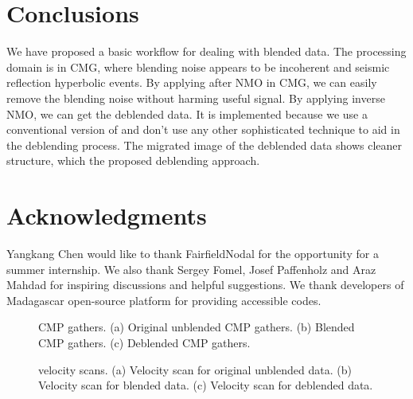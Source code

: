 \section{Conclusions}
We have proposed a basic workflow for dealing with blended data. The processing domain is in CMG, where blending noise appears to be incoherent and seismic reflection  hyperbolic events. By applying    after NMO in CMG, we can easily remove the blending noise without harming useful signal. By applying inverse NMO, we can get the deblended data.   It is  implemented because we  use a conventional version of  and don't use any other sophisticated technique to aid in the deblending process. The migrated image of the deblended data shows cleaner structure, which  the proposed deblending approach.

\section{Acknowledgments}
Yangkang Chen would like to thank FairfieldNodal for the opportunity for a summer internship. We also thank Sergey Fomel, Josef Paffenholz and Araz Mahdad for inspiring discussions and helpful suggestions. We  thank developers of Madagascar open-source platform for providing accessible codes.



\begin{figure}[htb!]
\centering
{}
\caption{ CMP gathers. (a) Original unblended CMP gathers. (b) Blended CMP gathers. (c) Deblended CMP gathers.}
\label{fig:data,data-b,data-db}
\end{figure}

\begin{figure}[htb!]
\centering
{}
\caption{ velocity scans. (a) Velocity scan for original unblended data. (b) Velocity scan for blended data. (c) Velocity scan for deblended data.}
\label{fig:vscan,vscan-b,vscan-db}
\end{figure}

